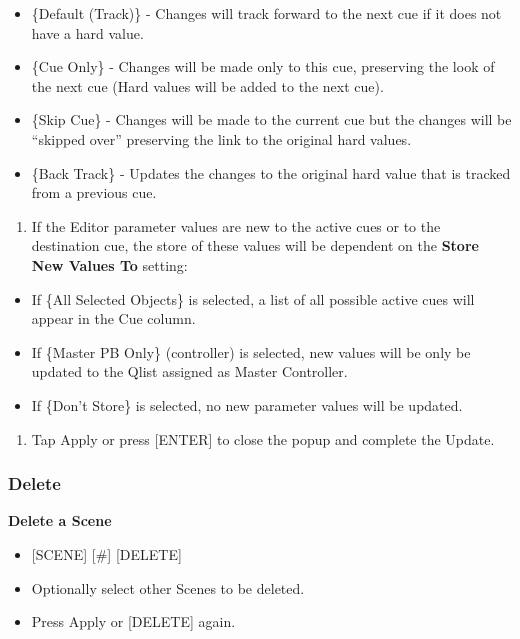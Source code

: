 \documentclass[
]{article}
\providecommand{\tightlist}{%
  \setlength{\itemsep}{0pt}\setlength{\parskip}{0pt}}
\begin{document}
\begin{itemize}
\item
  \{Default (Track)\} - Changes will track forward to the next cue if it does not have a hard value.
\item
  \{Cue Only\} - Changes will be made only to this cue, preserving the look of the next cue (Hard values will be added to the next cue).
\item
  \{Skip Cue\} - Changes will be made to the current cue but the changes will be ``skipped over'' preserving the link to the original hard values.
\item
  \{Back Track\} - Updates the changes to the original hard value that is tracked from a previous cue.
\end{itemize}

\begin{enumerate}
\def\labelenumi{\arabic{enumi}.}
\setcounter{enumi}{5}
\tightlist
\item
  If the Editor parameter values are new to the active cues or to the destination cue, the store of these values will be dependent on the \textbf{Store New Values To} setting:
\end{enumerate}

\begin{itemize}
\item
  If \{All Selected Objects\} is selected, a list of all possible active cues will appear in the Cue column.
\item
  If \{Master PB Only\} (controller) is selected, new values will be only be updated to the Qlist assigned as Master Controller.
\item
  If \{Don't Store\} is selected, no new parameter values will be updated.
\end{itemize}

\begin{enumerate}
\def\labelenumi{\arabic{enumi}.}
\setcounter{enumi}{6}
\tightlist
\item
  Tap Apply or press {[}ENTER{]} to close the popup and complete the Update.
\end{enumerate}

\hypertarget{delete}{%
\subsubsection{Delete}\label{delete}}

\textbf{Delete a Scene}

\begin{itemize}
\item
  {[}SCENE{]} {[}\#{]} {[}DELETE{]}
\item
  Optionally select other Scenes to be deleted.
\item
  Press Apply or {[}DELETE{]} again.
\end{itemize}
\end{document}
